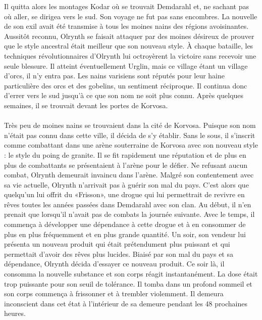\documentclass[main.tex]{subfiles}
\begin{document}
    Il quitta alors les montages Kodar où se trouvait Demdarahl et, ne sachant pas où aller, se dirigea vers le sud.
    Son voyage ne fut pas sans encombres. La nouvelle de son exil avait été transmise à tous les moines nains des régions avoisinantes.
    Aussitôt reconnu, Olrynth se faisait attaquer par des moines désireux de prouver que le style ancestral était meilleur que son nouveau style.
    À chaque bataille, les techniques révolutionnaires d'Olrynth lui octroyèrent la victoire sans recevoir une seule blessure.
    Il atteint éventuellement Urglin, mais ce village étant un village d'orcs, il n'y entra pas.
    Les nains varisiens sont réputés pour leur haine particulière des orcs et des gobelins, un sentiment réciproque.
    Il continua donc d'errer vers le sud jusqu'à ce que son nom ne soit plus connu.
    Après quelques semaines, il se trouvait devant les portes de Korvosa.\\
    \\
    Très peu de moines nains se trouvaient dans la cité de Korvosa. 
    Puisque son nom n'était pas connu dans cette ville, il décida de s'y établir.
    Sans le sous, il s'inscrit comme combattant dans une arène souterraine de Korvosa avec son nouveau style : le style du poing de granite.
    Il se fit rapidement une réputation et de plus en plus de combattants se présentaient à l'arène pour le défier.
    Ne refusant aucun combat, Olrynth demeurait invaincu dans l'arène.
    Malgré son contentement avec sa vie actuelle, Olrynth n'arrivait pas à guérir son mal du pays.
    C'est alors que quelqu'un lui offrit du «Frisson», une drogue qui lui permettrait de revivre en rêves toutes les années passées dans Demdarahl avec son clan.
    Au début, il n'en prenait que lorsqu'il n'avait pas de combats la journée suivante.
    Avec le temps, il commença à développer une dépendance à cette drogue et à en consommer de plus en plus fréquemment et en plus grande quantité.
    Un soir, son vendeur lui présenta un nouveau produit qui était prétendument plus puissant et qui permettait d'avoir des rêves plus lucides.
    Biaisé par son mal du pays et sa dépendance, Olrynth décida d'essayer ce nouveau produit.
    Ce soir là, il consomma la nouvelle substance et son corps réagit instantanément. 
    La dose était trop puissante pour son seuil de tolérance. 
    Il tomba dans un profond sommeil et son corps commença à frissonner et à trembler violemment.
    Il demeura inconscient dans cet état à l'intérieur de sa demeure pendant les 48 prochaines heures.\\
    \\
\end{document}
